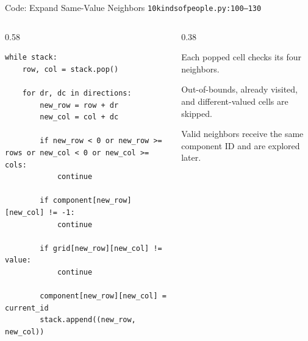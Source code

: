 \documentclass[aspectratio=169,11pt]{beamer}
\begin{document}
\begin{frame}[fragile]{Code: Expand Same-Value Neighbors}
\scriptsize
{} \texttt{10kindsofpeople.py:100--130}

\vspace{0.08cm}
\begin{columns}[T,totalwidth=\textwidth]
\begin{column}{0.58\textwidth}
\begin{lstlisting}[style=cpcode]
while stack:
    row, col = stack.pop()

    for dr, dc in directions:
        new_row = row + dr
        new_col = col + dc

        if new_row < 0 or new_row >= rows or new_col < 0 or new_col >= cols:
            continue

        if component[new_row][new_col] != -1:
            continue

        if grid[new_row][new_col] != value:
            continue

        component[new_row][new_col] = current_id
        stack.append((new_row, new_col))
\end{lstlisting}
\end{column}
\begin{column}{0.38\textwidth}
\begin{tightitemize}
  \item Each popped cell checks its four neighbors.
  \item Out-of-bounds, already visited, and different-valued cells are skipped.
  \item Valid neighbors receive the same component ID and are explored later.
\end{tightitemize}
\end{column}
\end{columns}
\end{frame}
\end{document}
